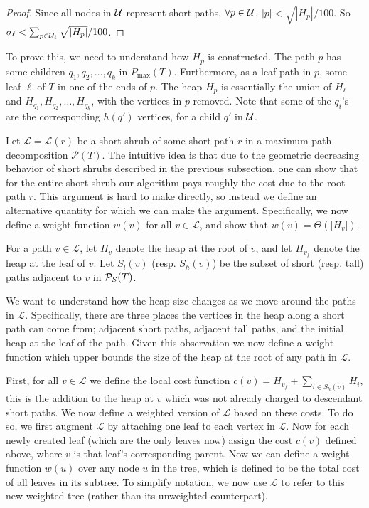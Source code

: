 \documentclass[11pt]{article}
\theoremstyle{definition}
\newcommand{\cU}{{\cal U}}
\newcommand{\pmax}{P_{\max}}
\begin{document}
{\begin{proof}
Since all nodes in $\cU$ represent short paths, $\forall p \in \cU$, $|p| < \sqrt{|H_p|}/100$.
So $\sigma_\ell < \sum_{p \in \cU_\ell} \sqrt{|H_p|}/100$. 

\end{proof}


To prove this, we need to understand how $H_p$ is constructed. The path $p$ has some children
$q_1, q_2, \ldots, q_k$ in $\pmax(T)$. Furthermore, as a leaf path in $p$, some leaf
$\ell$ of $T$ in one of the ends of $p$. The heap $H_p$ is essentially the
union of $H_\ell$ and $H_{q_1}, H_{q_2}, \ldots, H_{q_k}$, with the vertices in $p$
removed. Note that some of the $q_i$'s are the corresponding $h(q')$ vertices,
for a child $q'$ in $\cU$.


Let $\mathcal{L} = \mathcal{L}(r)$ be a short shrub of some short path $r$ in a maximum path decomposition $\mathcal{P}(T)$.
The intuitive idea is that due to the geometric decreasing behavior of short shrubs described in the previous subsection, 
one can show that for the entire short shrub our algorithm pays roughly the cost due to the root path $r$.  This argument 
is hard to make directly, so instead we define an alternative quantity for which we can make the argument.
Specifically, we now define a weight function $w(v)$ for all $v\in \mathcal{L}$, and show that $w(v)=\Theta(|H_v|)$.  

For a path $v\in \mathcal{L}$, let $H_v$ denote the heap at the root of $v$, and let $H_{v_f}$ denote the heap 
at the leaf of $v$.  Let $S_l(v)$ (resp. $S_h(v)$) be the subset of short (resp. tall) paths adjacent to $v$ in $\mathcal{P}_{\mathcal{S}}(T)$.

We want to understand how the heap size changes as we move around the paths in $\mathcal{L}$.  Specifically, there are 
three places the vertices in the heap along a short path can come from; adjacent short paths, adjacent tall paths, and the initial heap at the leaf of the path.  
Given this observation we now define a weight function which upper bounds the size of the heap at the root of any path in $\mathcal{L}$.

First, for all $v\in \mathcal{L}$ we define the local cost function $c(v) = H_{v_f}+\sum_{i\in S_h(v)} H_i$, this is the addition to the heap at $v$ which 
was not already charged to descendant short paths.  We now define a weighted version of $\mathcal{L}$ based on these costs.  
To do so, we first augment $\mathcal{L}$ by attaching one 
leaf to each vertex in $\mathcal{L}$.  Now for each newly created leaf (which are the only leaves now) assign the cost 
$c(v)$ defined above, where $v$ is that leaf's corresponding parent.  
Now we can define a weight function $w(u)$ over any node $u$ in the tree, which is defined to be the total cost of all leaves in its subtree.   
To simplify notation, we now use $\mathcal{L}$ to refer to this new weighted tree (rather than its unweighted counterpart).

}
\end{document}

